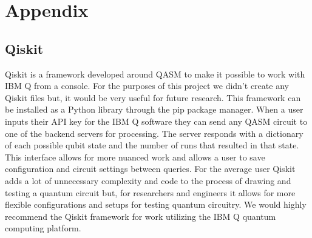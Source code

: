 \documentclass[12pt]{article}
\begin{document}
\newpage

\section{Appendix}
\subsection{Qiskit}
        Qiskit is a framework developed around QASM to make it possible to work with IBM Q from a console. For the purposes of this project we didn't create any Qiskit files but, it would be very useful for future research. This framework can be installed as a Python library through the pip package manager. When a user inputs their API key for the IBM Q software they can send any QASM circuit to one of the backend servers for processing. The server responds with a dictionary of each possible qubit state and the number of runs that resulted in that state. This interface allows for more nuanced work and allows a user to save configuration and circuit settings between queries. For the average user Qiskit adds a lot of unnecessary complexity and code to the process of drawing and testing a quantum circuit but, for researchers and engineers it allows for more flexible configurations and setups for testing quantum circuitry. We would highly recommend the Qiskit framework for work utilizing the IBM Q quantum computing platform.
\end{document}
